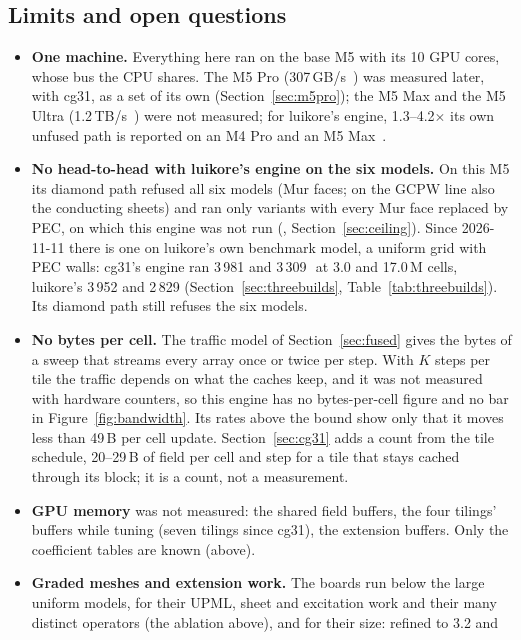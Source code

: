 \subsection{Limits and open questions}
\begin{itemize}
\item \textbf{One machine.} Everything here ran on the base M5 with its 10 GPU cores, whose bus the CPU shares. The M5
  Pro (307\,GB/s~\cite{macmini}) was measured later, with cg31, as a set of its own (Section~\ref{sec:m5pro}); the M5
  Max and the M5 Ultra (1.2\,TB/s~\cite{studiom5}) were not measured; for
  luikore's engine, 1.3--4.2$\times$ its own unfused path is reported on an M4 Pro and an M5 Max~\cite{luikore228}.
\item \textbf{No head-to-head with luikore's engine on the six models.} On this M5 its diamond path refused all six
  models (Mur faces; on the GCPW line also the conducting sheets) and ran only variants with every Mur face replaced
  by PEC, on which this engine was not run (, Section~\ref{sec:ceiling}). Since
  2026-11-11 there is one on luikore's own benchmark model, a uniform grid with PEC walls: cg31's engine ran 3\,981
  and 3\,309\,\MC\ at 3.0 and 17.0\,M cells, luikore's 3\,952 and 2\,829 (Section~\ref{sec:threebuilds},
  Table~\ref{tab:threebuilds}). Its diamond path still refuses the six models.
\item \textbf{No bytes per cell.} The traffic model of Section~\ref{sec:fused} gives the bytes of a sweep that streams
  every array once or twice per step. With $K$ steps per tile the traffic depends on what the caches keep, and it was
  not measured with hardware counters, so this engine has no bytes-per-cell figure and no bar in
  Figure~\ref{fig:bandwidth}. Its rates above the bound show only that it moves less than 49\,B per cell update.
  Section~\ref{sec:cg31} adds a count from the tile schedule, 20--29\,B of field per cell and step for a tile that
  stays cached through its block; it is a count, not a measurement.
\item \textbf{GPU memory} was not measured: the shared field buffers, the four tilings' buffers while tuning (seven
  tilings since cg31), the extension buffers. Only the coefficient tables are known (above).
\item \textbf{Graded meshes and extension work.} The boards run below the large uniform models, for their UPML, sheet
  and excitation work and their many distinct operators (the ablation above), and for their size: refined to 3.2 and

\end{itemize}
